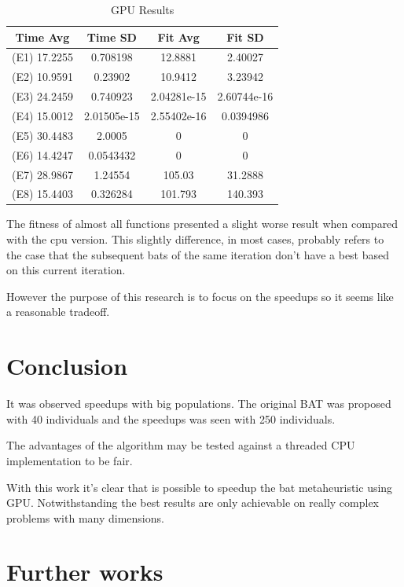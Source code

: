 \documentclass[conference]{IEEEtran}
\begin{document}
\begin{table}[!t]
    \renewcommand{\arraystretch}{1.3}
    \caption{GPU Results}
    \label{results}
    \centering
    \begin{tabular}{c|c|c|c}
    \hline
        Time Avg & Time SD & Fit Avg & Fit SD\\
    \hline
        (E1) 17.2255  & 0.708198 &  12.8881 & 2.40027 \\
        (E2) 10.9591  & 0.23902 & 10.9412 & 3.23942 \\
        (E3) 24.2459  & 0.740923  & 2.04281e-15 & 2.60744e-16 \\
        (E4) 15.0012 & 2.01505e-15 & 2.55402e-16 & 0.0394986 \\
        (E5) 30.4483  & 2.0005    & 0 & 0 \\
        (E6) 14.4247 & 0.0543432 & 0 & 0 \\
        (E7) 28.9867 & 1.24554 & 105.03 & 31.2888 \\
        (E8) 15.4403 & 0.326284 & 101.793 & 140.393 \\
    \end{tabular}
\end{table}

The fitness of almost all functions presented a slight worse result
when compared with the cpu version. This slightly difference, in most
cases, probably refers to the case that the subsequent bats of the same
iteration don't have a best based on this current iteration.

However the purpose of this research is to focus on the speedups so it
seems like a reasonable tradeoff.

\section{Conclusion}

It was observed speedups with big populations. The original BAT was
proposed with 40 individuals and the speedups was seen with 250
individuals.

The advantages of the algorithm may be tested against a threaded CPU
implementation to be fair.

With this work it's clear that is possible to speedup the bat
metaheuristic using GPU. Notwithstanding the best results are only
achievable on really complex problems with many dimensions.

\section{Further works}
\end{document}
